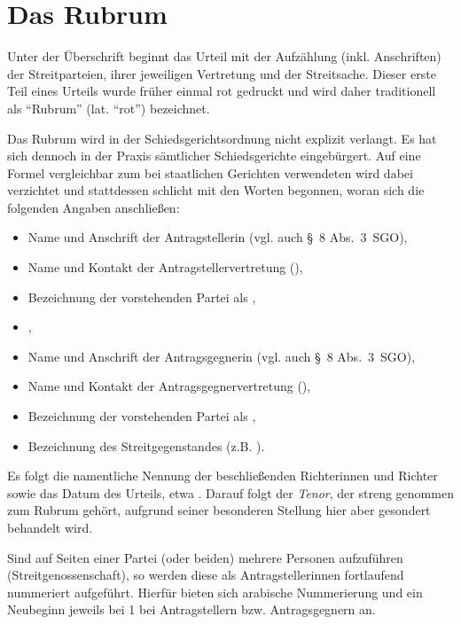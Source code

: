 \section{Das Rubrum}
\label{Urteilsaufbau:Rubrum}
Unter der Überschrift  beginnt das Urteil mit der Aufzählung (inkl. Anschriften) der Streitparteien, ihrer jeweiligen Vertretung und der Streitsache.
Dieser erste Teil eines Urteils wurde früher einmal rot gedruckt und wird daher traditionell als \enquote{Rubrum} (lat. \enquote{rot}) bezeichnet.

Das Rubrum wird in der Schiedsgerichtsordnung nicht explizit verlangt.
Es hat sich dennoch in der Praxis sämtlicher Schiedsgerichte eingebürgert.
Auf eine Formel vergleichbar zum bei staatlichen Gerichten verwendeten  wird dabei verzichtet und stattdessen schlicht mit den Worten  begonnen, woran sich die folgenden Angaben anschließen:
\begin{itemize}
\item Name und Anschrift der Antragstellerin (vgl. auch \S~8 Abs.~3~SGO),
\item Name und Kontakt der Antragstellervertretung (),
\item Bezeichnung der vorstehenden Partei als ,
\item {},
\item Name und Anschrift der Antragsgegnerin (vgl. auch \S~8 Abs.~3~SGO),
\item Name und Kontakt der Antragsgegnervertretung (),
\item Bezeichnung der vorstehenden Partei als ,
\item Bezeichnung des Streitgegenstandes (z.B. ).
\end{itemize}

Es folgt die namentliche Nennung der beschließenden Richterinnen und Richter sowie das Datum des Urteils, etwa .
Darauf folgt der \emph{Tenor}, der streng genommen zum Rubrum gehört, aufgrund seiner besonderen Stellung hier aber gesondert behandelt wird.

Sind auf Seiten einer Partei (oder beiden) mehrere Personen aufzuführen (Streitgenossenschaft), so werden diese als Antragstellerinnen fortlaufend nummeriert aufgeführt.
Hierfür bieten sich arabische Nummerierung und ein Neubeginn jeweils bei 1 bei Antragstellern bzw. Antragsgegnern an.

